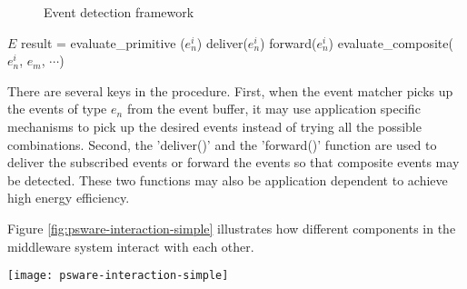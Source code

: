 \begin{figure}
\centering
{}
\caption{Event detection framework}
\label{fig:eventdetectionframework2}
\end{figure}

\begin{algorithm}
\begin{algorithmic}[1]
\REQUIRE \(E\)
				\STATE result = evaluate\_primitive (\(e_n^i\))
						\STATE deliver(\(e_n^i\))
					\ELSE
						\STATE forward(\(e_n^i\))
					\ENDIF
				\ENDIF
			\ELSE
					\STATE evaluate\_composite(\(e_n^i\), \(e_m\), \(\cdots \))
				\ENDFOR
			\ENDIF
		\ENDFOR
	\ENDFOR
\end{algorithmic}
\caption{Procedure of the event matcher}
\label{algo:eventMatcher}
\end{algorithm}

There are several keys in the procedure. First, when the event matcher picks up the events of type \(e_n\) from the event buffer, it may use application specific mechanisms to pick up the desired events instead of trying all the possible combinations. Second, the 'deliver()' and the 'forward()' function are used to deliver the subscribed events or forward the events so that composite events may be detected. These two functions may also be application dependent to achieve high energy efficiency.

Figure \ref{fig:psware-interaction-simple} illustrates how different components in the middleware system interact with each other.

\begin{figure*}
\centering
\texttt{[image: psware-interaction-simple]}
\caption{PSWare components interaction}
\label{fig:psware-interaction-simple}
\end{figure*}
